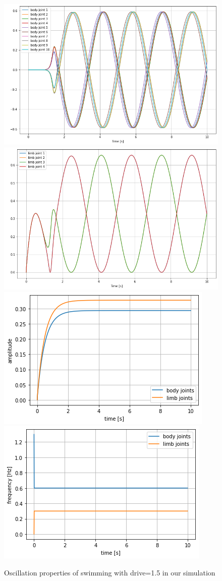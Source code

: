 \documentclass{cmc}
\begin{document}
\begin{figure}[H]
\centering
\includegraphics[height=0.3\columnwidth]{figures/8a_d15_spine.png}
\includegraphics[height=0.3\columnwidth]{figures/8a_d15_limb.png}
\includegraphics[height=0.3\columnwidth]{figures/8a_d15_amp.png}
\includegraphics[height=0.3\columnwidth]{figures/8a_d15_freq.png}
\caption{Oscillation properties of swimming with drive=1.5 in our simulation}
\label{a1}
\end{figure}
\end{document}
